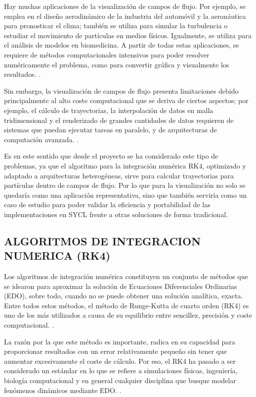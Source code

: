 \documentclass[12pt]{article}
\begin{document}
Hay muchas aplicaciones de la visualización de campos de flujo. Por ejemplo, se emplea en el diseño aerodinámico de la industria del automóvil y la aeronáutica para pronosticar el clima; también se utiliza para simular la turbulencia o estudiar el movimiento de partículas en medios físicos. Igualmente, se utiliza para el análisis de modelos en biomedicina. A partir de todas estas aplicaciones, se requiere de métodos computacionales intensivos para poder resolver numéricamente el problema, como para convertir gráfica y visualmente los resultados. \cite{laramee_state_2004} \cite{post_state_2003}.

Sin embargo, la visualización de campos de flujo presenta limitaciones debido principalmente al alto coste computacional que se deriva de ciertos aspectos; por ejemplo, el cálculo de trayectorias, la interpolación de datos en malla tridimensional y el renderizado de grandes cantidades de datos requieren de sistemas que puedan ejecutar tareas en paralelo, y de arquitecturas de computación avanzada. \cite{post_state_2003}.

Es en este sentido que desde el proyecto se ha considerado este tipo de problemas, ya que el algoritmo para la integración numérica RK4, optimizado y adaptado a arquitecturas heterogéneas, sirve para calcular trayectorias para partículas dentro de campos de flujo. Por lo que para la visualización no solo se quedaría como una aplicación representativa, sino que también serviría como un caso de estudio para poder validar la eficiencia y portabilidad de las implementaciones en SYCL frente a otras soluciones de forma tradicional.

\subsection{ALGORITMOS DE INTEGRACION NUMERICA (RK4)}

Los algoritmos de integración numérica constituyen un conjunto de métodos que se idearon para aproximar la solución de Ecuaciones Diferenciales Ordinarias (EDO), sobre todo, cuando no se puede obtener una solución analítica, exacta. Entre todos estos métodos, el método de Runge-Kutta de cuarto orden (RK4) es uno de los más utilizados a causa de su equilibrio entre sencillez, precisión y coste computacional. \cite{butcher_numerical_2008}.

La razón por la que este método es importante, radica en su capacidad para proporcionar resultados con un error relativamente pequeño sin tener que aumentar excesivamente el coste de cálculo. Por eso, el RK4 ha pasado a ser considerado un estándar en lo que se refiere a simulaciones físicas, ingeniería, biología computacional y en general cualquier disciplina que busque modelar fenómenos dinámicos mediante EDO. \cite{suli_introduction_2003}.
\end{document}

